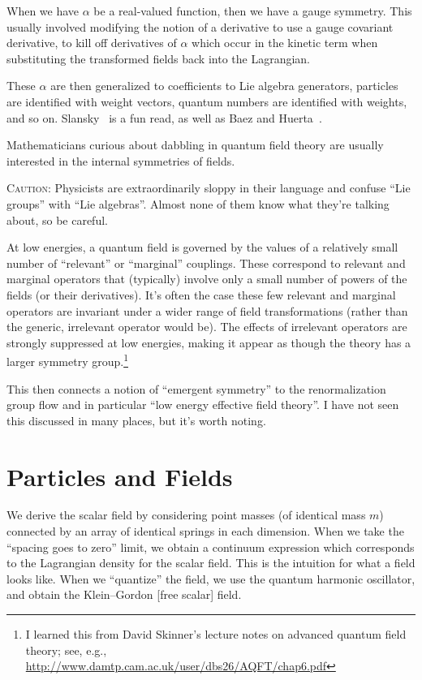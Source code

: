 \M
When we have $\alpha$ be a real-valued function, then we have a gauge
symmetry. This usually involved modifying the notion of a derivative to
use a gauge covariant derivative, to kill off derivatives of $\alpha$
which occur in the kinetic term when substituting the transformed fields
back into the Lagrangian.

These $\alpha$ are then generalized to coefficients to Lie algebra
generators, particles are identified with weight vectors, quantum
numbers are identified with weights, and so on. Slansky~\cite{Slansky:1981yr}
is a fun read, as well as Baez and Huerta~\cite{Baez:2009dj}.

\M
Mathematicians curious about dabbling in quantum field theory are
usually interested in the internal symmetries of fields. 

\textsc{Caution:} Physicists are extraordinarily sloppy in their
language and confuse ``Lie groups'' with ``Lie algebras''. Almost none
of them know what they're talking about, so be careful.

At low energies, a quantum field is governed by the values of a
relatively small number of ``relevant'' or ``marginal'' couplings. These
correspond to relevant and marginal operators that (typically) involve
only a small number of powers of the fields (or their derivatives). It's
often the case these few relevant and marginal operators are invariant
under a wider range of field transformations (rather than the generic,
irrelevant operator would be). The effects of irrelevant operators are
strongly suppressed at low energies, making it appear as though the
theory has a larger symmetry group.\footnote{I learned this from David
Skinner's lecture notes on advanced quantum field theory; see, e.g.,
\url{http://www.damtp.cam.ac.uk/user/dbs26/AQFT/chap6.pdf}}

This then connects a notion of ``emergent symmetry'' to the
renormalization group flow and in particular ``low energy effective
field theory''. I have not seen this discussed in many places, but it's
worth noting.

\section{Particles and Fields}

We derive the scalar field by considering point masses (of identical
mass $m$) connected by an array of identical springs in each
dimension. When we take the ``spacing goes to zero'' limit, we obtain a
continuum expression which corresponds to the Lagrangian density for the
scalar field. This is the intuition for what a field looks like. When we
``quantize'' the field, we use the quantum harmonic oscillator, and
obtain the Klein--Gordon [free scalar] field.

